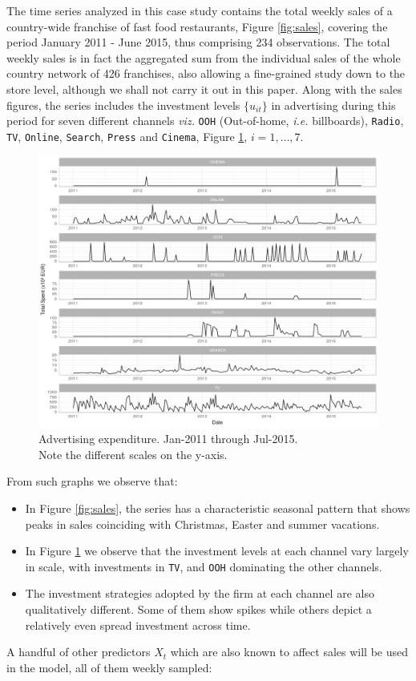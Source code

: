 The time series analyzed in this case study contains the total weekly sales of a country-wide franchise of fast food restaurants, Figure \ref{fig:sales}, covering the period January 2011 - June 2015, thus comprising 234 observations. The total weekly sales is in fact the aggregated sum from the individual sales of the whole country network of 426 franchises, also allowing a fine-grained study down to the store level, although we shall not carry it out in this paper. Along with the sales figures, the series includes the investment levels $\{u_{it}\}$  in advertising during this period  for seven different channels \emph{viz.} \texttt{OOH} (Out-of-home, \emph{i.e.} billboards), \texttt{Radio}, \texttt{TV}, \texttt{Online}, \texttt{Search}, \texttt{Press} and \texttt{Cinema}, Figure \ref{fig:canales}, $i=1,\ldots,7$.



\begin{figure}[h]
\centering
\includegraphics[scale=0.5]{figures/02_canales_b.png}
\caption{Advertising expenditure. Jan-2011 through Jul-2015. \\ Note the different scales on the y-axis.}\label{fig:canales}
\end{figure}

From such graphs we observe that:
\begin{itemize}
\item In Figure \ref{fig:sales}, the series has a characteristic seasonal pattern that shows peaks in sales coinciding with Christmas, Easter and summer vacations. 
\item In Figure \ref{fig:canales} we observe that the investment levels at each channel vary largely in scale, with investments in \texttt{TV}, and \texttt{OOH} dominating the other channels.
\item The investment strategies adopted by the firm at each channel are also qualitatively different. Some of them show spikes while others depict a relatively even spread investment across time.%
\end{itemize}
A handful of other predictors $X_t$ which are also known to affect sales will be used in the model, all of them weekly sampled:


